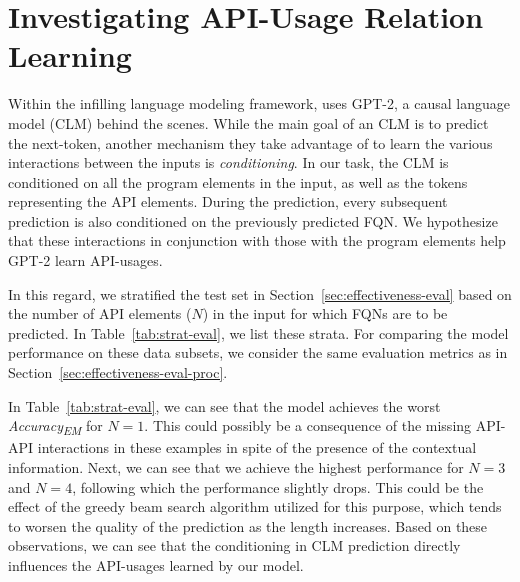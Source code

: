\section{Investigating API-Usage Relation Learning }
\label{sec:eval}

%

Within the infilling language modeling framework, {\tool} uses GPT-2, a causal language model (CLM) behind the scenes. While the main goal of an CLM is to predict the next-token, another mechanism they take advantage of to learn the various interactions between the inputs is {\em conditioning}. In our task, the CLM is conditioned on all the program elements in the input, as well as the \blank tokens representing the API elements. During the prediction, every subsequent prediction is also conditioned on the previously predicted FQN. We hypothesize that these interactions in conjunction with those with the program elements help GPT-2 learn API-usages.

In this regard, we stratified the test set in Section~\ref{sec:effectiveness-eval} based on the number of API elements ($N$) in the input for which FQNs are to be predicted. In Table~\ref{tab:strat-eval}, we list these strata. For comparing the model performance on these data subsets, we consider the same evaluation metrics as in Section~\ref{sec:effectiveness-eval-proc}.

In Table~\ref{tab:strat-eval}, we can see that the model achieves the worst \textit{Accuracy\textsubscript{EM}} for $N=1$. This could possibly be a consequence of the missing API-API interactions in these examples in spite of the presence of the contextual information. Next, we can see that we achieve the highest performance for $N=3$ and $N=4$, following which the performance slightly drops. This could be the effect of the greedy beam search algorithm utilized for this purpose, which tends to worsen the quality of the prediction as the length increases. Based on these observations, we can see that the conditioning in CLM prediction directly influences the API-usages learned by our model.